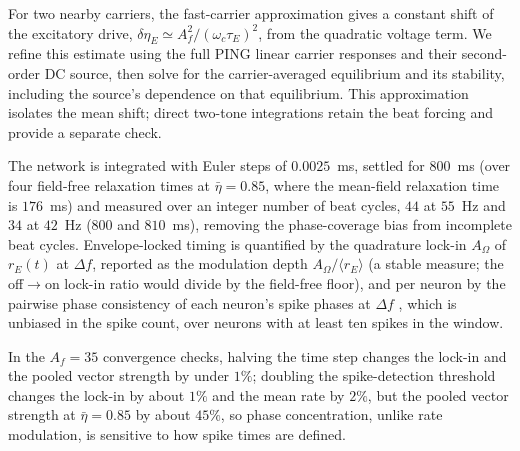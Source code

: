 \documentclass[11pt,a4paper]{article}
\begin{document}
For two nearby carriers, the fast-carrier approximation gives a constant shift
of the excitatory drive, $\delta\eta_E\simeq A_f^2/(\omega_c\tau_E)^2$, from the
quadratic voltage term. We refine this estimate using the full PING linear carrier
responses and their second-order DC source, then solve for the carrier-averaged
equilibrium and its stability, including the source's dependence on that equilibrium.
This approximation isolates the mean shift; direct two-tone integrations retain
the beat forcing and provide a separate check.

The network is integrated with Euler steps of $0.0025$~ms, settled for $800$~ms (over
four field-free relaxation times at $\bar\eta=0.85$, where the mean-field relaxation time is
$176$~ms) and measured over an integer number of beat cycles, $44$ at $55$~Hz and $34$ at
$42$~Hz ($800$ and $810$~ms), removing the phase-coverage bias from incomplete
beat cycles. Envelope-locked timing is quantified by the quadrature lock-in $A_\Omega$ of
$r_E(t)$ at $\Delta f$, reported as the modulation depth $A_\Omega/\langle r_E\rangle$ (a
stable measure; the off$\to$on lock-in ratio would divide by the field-free floor), and
per neuron by the pairwise phase consistency of each neuron's spike phases at $\Delta f$
\cite{vinck2010}, which is unbiased in the spike count, over neurons with at least ten
spikes in the window.

In the $A_f=35$ convergence checks, halving the time step changes the lock-in and the pooled vector
strength by under $1\%$; doubling the spike-detection threshold changes the lock-in by
about $1\%$ and the mean rate by $2\%$, but the pooled vector strength at
$\bar\eta=0.85$ by about $45\%$, so phase concentration, unlike rate modulation, is sensitive to
how spike times are defined.
\end{document}
